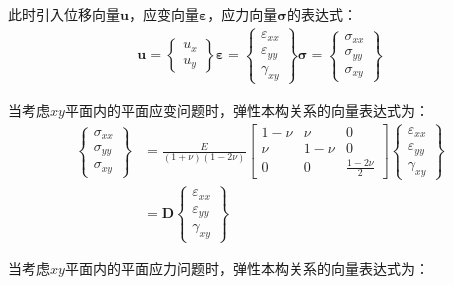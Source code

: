 此时引入位移向量$\pmb{u}$，应变向量$\pmb{\varepsilon}$，应力向量$\pmb{\sigma}$的表达式：
\begin{equation}
\begin{split}
    \pmb{u}=\left\{\begin{matrix} u_x\\u_y\end{matrix}\right\}
    \pmb{\varepsilon}=\left\{\begin{matrix}  
        \varepsilon_{xx}\\\varepsilon_{yy}\\\gamma_{xy}
    \end{matrix}\right\}
    \pmb{\sigma}=\left\{\begin{matrix}
        \sigma_{xx}\\\sigma_{yy}\\\sigma_{xy}
    \end{matrix}\right\}
\end{split}
\end{equation}\par
当考虑$xy$平面内的平面应变问题时，弹性本构关系的向量表达式为：
\begin{equation}
\begin{split}
    \left\{\begin{matrix}
        \sigma_{xx}\\\sigma_{yy}\\\sigma_{xy}
    \end{matrix}\right\}&=\frac{E}{(1+\nu)(1-2\nu)}
    \left[\begin{matrix}
        1-\nu&\nu&0\\\nu&1-\nu&0\\0&0&\frac{1-2\nu}{2}
    \end{matrix}\right]
    \left\{\begin{matrix}
        \varepsilon_{xx}\\\varepsilon_{yy}\\\gamma_{xy}
    \end{matrix}\right\}\\
    &=\pmb{D}\left\{\begin{matrix}\varepsilon_{xx}\\\varepsilon_{yy}\\\gamma_{xy}\end{matrix}\right\}
\end{split}
\end{equation}\par
当考虑$xy$平面内的平面应力问题时，弹性本构关系的向量表达式为：

